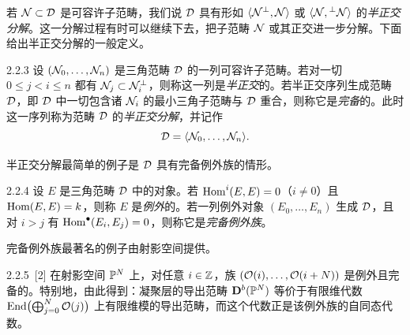 若 $\mathcal{N}\subset\mathcal{D}$ 是可容许子范畴，我们说 $\mathcal{D}$ 具有形如 $\langle\mathcal{N}^{\perp},\mathcal{N}\rangle$ 或 $\langle\mathcal{N},{}^{\perp}\mathcal{N}\rangle$ 的\emph{半正交分解}。这一分解过程有时可以继续下去，把子范畴 $\mathcal{N}$ 或其正交进一步分解。下面给出半正交分解的一般定义。

\begin{definition}{2.2.3}
设 $(\mathcal{N}_0,\dots,\mathcal{N}_n)$ 是三角范畴 $\mathcal{D}$ 的一列可容许子范畴。若对一切 $0\leqslant j<i\leqslant n$ 都有 $\mathcal{N}_j\subset\mathcal{N}_i^{\perp}$，则称这一列是\emph{半正交}的。若半正交序列生成范畴 $\mathcal{D}$，即 $\mathcal{D}$ 中一切包含诸 $\mathcal{N}_i$ 的最小三角子范畴与 $\mathcal{D}$ 重合，则称它是\emph{完备}的。此时这一序列称为范畴 $\mathcal{D}$ 的\emph{半正交分解}，并记作
\[
\mathcal{D}=\langle\mathcal{N}_0,\dots,\mathcal{N}_n\rangle.
\]
\end{definition}


半正交分解最简单的例子是 $\mathcal{D}$ 具有完备例外族的情形。

\begin{definition}{2.2.4}
设 $E$ 是三角范畴 $\mathcal{D}$ 中的对象。若 $\operatorname{Hom}^i(E,E)=0$（$i\neq0$）且 $\operatorname{Hom}(E,E)=k$，则称 $E$ 是\emph{例外}的。若一列例外对象 $(E_0,\dots,E_n)$ 生成 $\mathcal{D}$，且对 $i>j$ 有 $\operatorname{Hom}^{\bullet}(E_i,E_j)=0$，则称它是\emph{完备例外族}。
\end{definition}

完备例外族最著名的例子由射影空间提供。

\begin{example}{2.2.5}~[2] 在射影空间 $\mathbb{P}^N$ 上，对任意 $i\in\mathbb{Z}$，族 $(\mathcal{O}(i),\dots,\mathcal{O}(i+N))$ 是例外且完备的。特别地，由此得到：凝聚层的导出范畴 $\mathbf{D}^{b}(\mathbb{P}^N)$ 等价于有限维代数 $\operatorname{End}\bigl(\bigoplus_{j=0}^{N}\mathcal{O}(j)\bigr)$ 上有限维模的导出范畴，而这个代数正是该例外族的自同态代数。
\end{example}


